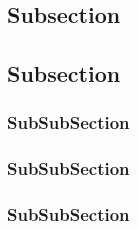 \subsection{Subsection}

\subsection{Subsection}

\subsubsection{SubSubSection}

\subsubsection{SubSubSection}

\subsubsection{SubSubSection}
